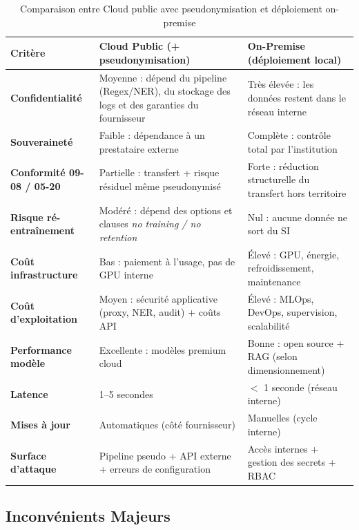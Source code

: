 \documentclass[12pt, a4paper]{report}
\begin{document}
\begin{table}[H]
\centering
\renewcommand{\arraystretch}{1.3}
\setlength{\tabcolsep}{6pt}
\begin{tabular}{|p{4.0cm}|p{5.5cm}|p{5.5cm}|}
\hline
\rowcolor{primary}
\textbf{\color{white}Critère}
  & \textbf{\color{white}Cloud Public (+ pseudonymisation)}
  & \textbf{\color{white}On-Premise (déploiement local)} \\
\hline
\textbf{Confidentialité}
  & Moyenne : dépend du pipeline (Regex/NER), du stockage des logs et
    des garanties du fournisseur
  & Très élevée : les données restent dans le réseau interne \\
\hline
\textbf{Souveraineté}
  & Faible : dépendance à un prestataire externe
  & Complète : contrôle total par l'institution \\
\hline
\textbf{Conformité 09-08 / 05-20}
  & Partielle : transfert + risque résiduel même pseudonymisé
  & Forte : réduction structurelle du transfert hors territoire \\
\hline
\textbf{Risque ré-entraînement}
  & Modéré : dépend des options et clauses \textit{no training /
    no retention}
  & Nul : aucune donnée ne sort du SI \\
\hline
\textbf{Coût infrastructure}
  & Bas : paiement à l'usage, pas de GPU interne
  & Élevé : GPU, énergie, refroidissement, maintenance \\
\hline
\textbf{Coût d'exploitation}
  & Moyen : sécurité applicative (proxy, NER, audit) + coûts API
  & Élevé : MLOps, DevOps, supervision, scalabilité \\
\hline
\textbf{Performance modèle}
  & Excellente : modèles premium cloud
  & Bonne : open source + RAG (selon dimensionnement) \\
\hline
\textbf{Latence}
  & 1--5 secondes
  & \(<\) 1 seconde (réseau interne) \\
\hline
\textbf{Mises à jour}
  & Automatiques (côté fournisseur)
  & Manuelles (cycle interne) \\
\hline
\textbf{Surface d'attaque}
  & Pipeline pseudo + API externe + erreurs de configuration
  & Accès internes + gestion des secrets + RBAC \\
\hline
\end{tabular}
\caption{Comparaison entre Cloud public avec pseudonymisation et
déploiement on-premise}
\label{tab:comparaison_annexe}
\end{table}

\subsection{Inconvénients Majeurs}
\end{document}
